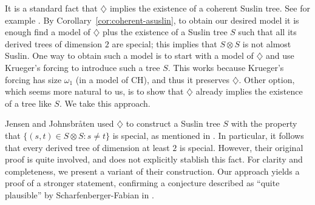 \documentclass{amsart}
\theoremstyle{definition}
\newcommand{\CH}{\mathrm{CH}}
\begin{document}
It is a standard fact that $\diamondsuit$ implies the existence
of a coherent Suslin tree. See for example \cite{Todorcevic1984}.
By Corollary~\ref{cor:coherent-asuslin},
to obtain our desired model it is enough find a model of
$\diamondsuit$ plus the existence of a Suslin tree
$S$ such that all its derived trees of dimension $2$ are special;
this implies that $S \otimes S$ is not almost Suslin.
One way to obtain such a model is to start with a model
of $\diamondsuit$ and use Krueger's forcing
\cite[Theorem 4.4]{Krueger2020suslin} to introduce such a tree $S$.
This works because Krueger's forcing has size $\omega_{1}$ (in a model
of $\CH$), and thus it preserves $\diamondsuit$. Other option,
which seems more natural to us, is to show that $\diamondsuit$
already implies the existence of a tree like $S$. We take
this approach.

Jensen and Johnsbr{\r a}ten \cite{Jen} used $\diamondsuit$ to
construct a Suslin tree $S$ with the property that $\{(s,t) \in S
\otimes S : s \neq t\}$ is special, as mentioned in \cite[9.15
(vi)]{Todorcevic1984}.  In particular, it follows that every derived
tree of dimension at least $2$ is special.  However, their original
proof is quite involved, and does not explicitly stablish this
fact. For clarity and completeness, we present a variant of their
construction. Our approach yields a proof of a stronger statement,
confirming a conjecture described as ``quite plausible'' by
Scharfenberger-Fabian in \cite[Sec3.6]{Scharfenberger2010}.
\end{document}
